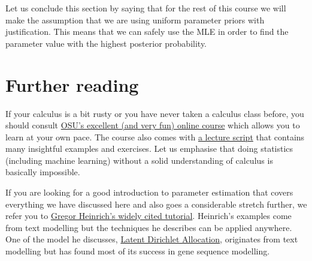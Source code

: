 Let us conclude this section by saying that for the rest of this course we will make the assumption that we are using uniform parameter priors with justification.
This means that we can safely use the MLE in order to find the parameter value with the highest posterior probability.


\section*{Further reading}
If your calculus is a bit rusty or you have never taken a calculus class before, you should consult 
\href{https://www.coursera.org/learn/calculus1}{OSU's excellent (and very fun) online course} which allows you to learn at your own pace. The course also comes with
\href{https://mooculus.osu.edu/handouts}{a lecture script} that contains many insightful examples and exercises. Let us emphasise that doing statistics (including
machine learning) without a solid understanding of calculus is basically impossible.

If you are looking for a good introduction to
parameter estimation that covers everything we have discussed here and also goes a considerable stretch further, we refer you to 
\href{http://www.arbylon.net/publications/text-est.pdf}{Gregor Heinrich's widely cited tutorial}. Heinrich's examples come from text modelling but the techniques he
describes can be applied anywhere. One of the model he discusses, \href{https://en.wikipedia.org/wiki/Latent_Dirichlet_allocation}{Latent Dirichlet Allocation}, originates
from text modelling but has found most of its success in gene sequence modelling. 


